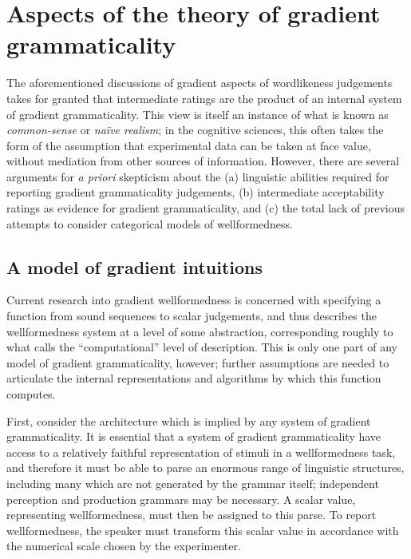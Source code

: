
\section{Aspects of the theory of gradient grammaticality}

The aforementioned discussions of gradient aspects of wordlikeness judgements takes for granted that intermediate ratings are the product of an internal system of gradient grammaticality.
This view is itself an instance of what is known as \emph{common-sense} or \emph{naïve realism}; in the cognitive sciences, this often takes the form of the assumption that experimental data can be taken at face value, without mediation from other sources of information.
However, there are several arguments for \emph{a priori} skepticism about the (a) linguistic abilities required for reporting gradient grammaticality judgements, (b) intermediate acceptability ratings as evidence for gradient grammaticality, and (c) the total lack of previous attempts to consider categorical models of wellformedness.

\subsection{A model of gradient intuitions}

Current research into gradient wellformedness is concerned with specifying a function from sound sequences to scalar judgements, and thus describes the wellformedness system at a level of some abstraction, corresponding roughly to what \citet{Marr1982} calls the ``computational'' level of description.
This is only one part of any model of gradient grammaticality, however; further assumptions are needed to articulate the internal representations and algorithms by which this function computes.

First, consider the architecture which is implied by any system of gradient grammaticality.
It is essential that a system of gradient grammaticality have access to a relatively faithful representation of stimuli in a wellformedness task, and therefore it must be able to parse an enormous range of linguistic structures, including many which are not generated by the grammar itself; independent perception and production grammars may be necessary. 
A scalar value, representing wellformedness, must then be assigned to this parse.
To report wellformedness, the speaker must transform this scalar value in accordance with the numerical scale chosen by the experimenter.

